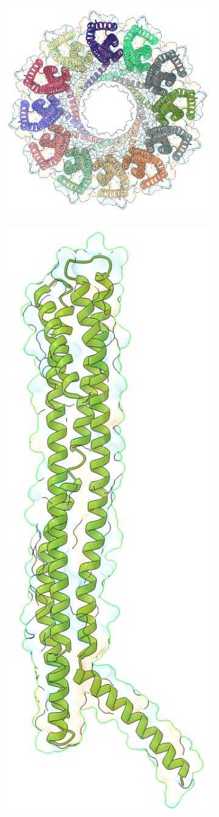 \begin{figure}[ht!]
\begin{centering}
  \begin{subfigure}[t]{\dimexpr.35\linewidth-1.3em\relax}
  \centering
  \includegraphics[width=\linewidth,valign=t]{Figures/clya-top-c.png}
  \end{subfigure}
  \begin{subfigure}[t]{\dimexpr.35\linewidth-1.3em\relax}
  \centering
  \includegraphics[width=.35\linewidth,valign=t]{Figures/clya-mon-c.png}
  \end{subfigure}%



\end{centering}
\end{figure}

